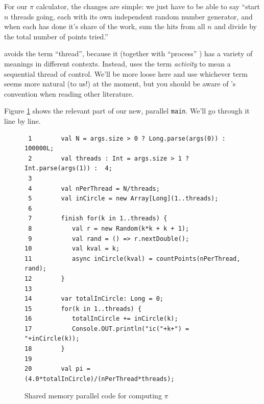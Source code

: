 For our $\pi$ calculator, the changes are simple: we just have to be able to
say ``start $n$ threads going, each with its own independent random number
generator, and when each has done it's share of the work, sum the hits from all
$n$ and divide by the total number of points tried.''  

\Xten{} avoids the term ``thread'', because it (together with ``process'' ) has
a variety of meanings in different contexts.  Instead, \Xten{} uses the term 
{\em activity} to mean a sequential thread of control. We'll be more loose here
and use whichever term seems more natural (to us!) at the moment, but you
should be aware of \Xten's convention when reading other literature.

Figure \ref{fig:mcpm} shows the relevant part of our new, parallel {\tt main}.
We'll go through it line by line.
\begin{figure}[!bthp]
\hrulefill
\begin{verbatim}
 1        val N = args.size > 0 ? Long.parse(args(0)) : 100000L;  
 2        val threads : Int = args.size > 1 ? Int.parse(args(1)) :  4; 
 3  
 4        val nPerThread = N/threads; 
 5        val inCircle = new Array[Long](1..threads);   
 6   
 7        finish for(k in 1..threads) { 
 8           val r = new Random(k*k + k + 1);       
 9           val rand = () => r.nextDouble();       
10           val kval = k;                     
11           async inCircle(kval) = countPoints(nPerThread, rand); 
12        }                                 
13  
14        var totalInCircle: Long = 0;             
15        for(k in 1..threads) {      
16           totalInCircle += inCircle(k);         
17           Console.OUT.println("ic("+k+") = "+inCircle(k)); 
18        }                                 
19  
20        val pi = (4.0*totalInCircle)/(nPerThread*threads); 
\end{verbatim}
\hrulefill
\caption{Shared memory parallel code for computing $\pi$}\label{fig:mcpm}
\end{figure}
